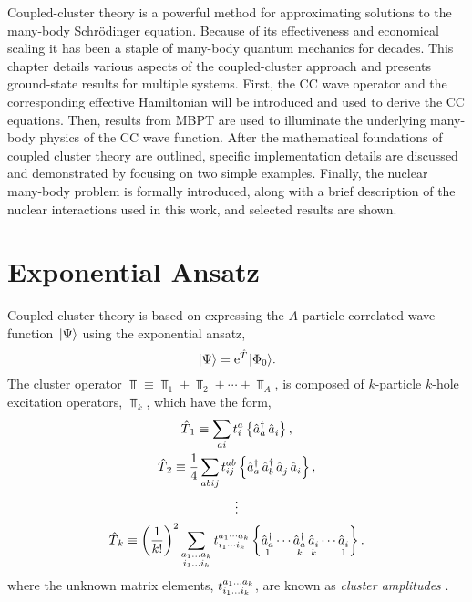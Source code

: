 \documentclass[thesis.tex]{subfiles}
\begin{document}
Coupled-cluster theory is a powerful method for approximating solutions to the many-body Schr\"odinger equation.  Because of its effectiveness and economical scaling it has been a staple of many-body quantum mechanics for decades.  This chapter details various aspects of the coupled-cluster approach and presents ground-state results for multiple systems.  First, the CC wave operator and the corresponding effective Hamiltonian will be introduced and used to derive the CC equations.  Then, results from MBPT are used to illuminate the underlying many-body physics of the CC wave function.  After the mathematical foundations of coupled cluster theory are outlined, specific implementation details are discussed and demonstrated by focusing on two simple examples.  Finally, the nuclear many-body problem is formally introduced, along with a brief description of the nuclear interactions used in this work, and selected results are shown.

\section{Exponential Ansatz} \label{section:exponentialansatz}

Coupled cluster theory is based on expressing the $A$-particle correlated wave function $\hspace{1pt}\lvert \Psi \rangle$ using the exponential ansatz,
\begin{equation} \label{eq:cc_ansatz}
  \hspace{1pt}\lvert \Psi \rangle = \operatorname{e}^{\hat{T}\hspace{-0.25pt}}\hspace{1pt}\lvert \Phi_{0} \rangle.
\end{equation}
The cluster operator $\Top \equiv \Top_{1} + \Top_{2} + \cdots + \Top_{A}$, is composed of $k$-particle $k$-hole excitation operators, $\Top_{k}$, which have the form,
\begin{gather} \label{eq:cc_amps}
  \hat{T}\hspace{-0.25pt}_{1} \equiv \sum_{ai} t^{a}_{i}\left\{\mathop{\hat{a}^{\dagger}_{a}}\mathop{\hat{a}^{}_{i}}\right\}, \notag \\
  \hat{T}\hspace{-0.25pt}_{2} \equiv \frac{1}{4}\sum_{abij} t^{ab}_{ij}\left\{\mathop{\hat{a}^{\dagger}_{a}}\mathop{\hat{a}^{\dagger}_{b}}\mathop{\hat{a}^{}_{j}}\mathop{\hat{a}^{}_{i}}\right\}, \notag \\
  \vdots \notag \\
  \hat{T}\hspace{-0.25pt}_{k} \equiv \left(\frac{1}{k!}\right)^2 \sum_{\substack{a_{1} \ldots a_{k} \\ i_{1} \ldots i_{k}}} t^{a_{1} \cdots a_{k}}_{i_{1} \cdots i_{k}}\left\{\mathop{\hat{a}^{\dagger}_{a}}_{1} \cdots \mathop{\hat{a}^{\dagger}_{a}}_{k} \mathop{\hat{a}^{}_{i}}_{k} \cdots \mathop{\hat{a}^{}_{i}}_{1}\right\}.
\end{gather}
where the unknown matrix elements, $t^{a_{1} \ldots a_{k}}_{i_{1} \ldots i_{k}}$, are known as \textit{cluster amplitudes} \cite{SHAVITT2009}.
\end{document}
